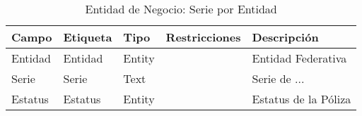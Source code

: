 \begin{table}[H]
	\caption{Entidad de Negocio: Serie por Entidad}
	\label{tab:fields-dom-SerieEntidad}
	\begin{center}
	\begin{tabular}{ l l l l l }
		\hline
		\textbf{Campo} &
		\textbf{Etiqueta} &
		\textbf{Tipo} &
		\textbf{Restricciones} &
		\textbf{Descripción} \\
		\hline
		Entidad &
		Entidad &
		Entity &
		 &
		Entidad Federativa \\
		Serie &
		Serie &
		Text &
		 &
		Serie de ... \\
		Estatus &
		Estatus &
		Entity &
		 &
		Estatus de la Póliza \\
		\hline
	\end{tabular}
	\end{center}
\end{table}


